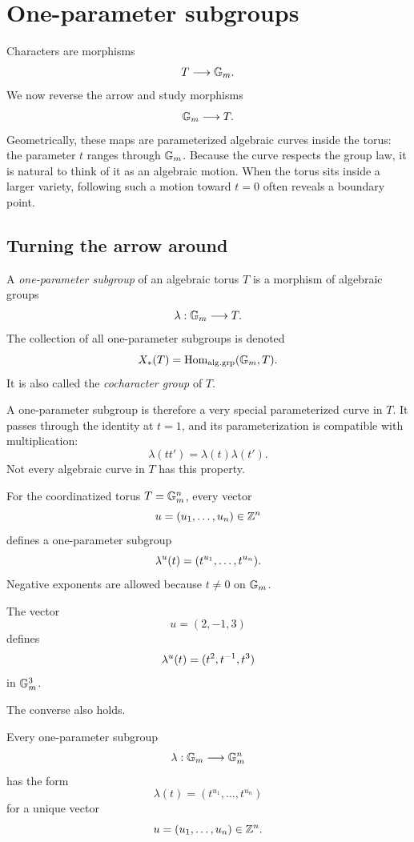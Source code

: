 \section{One-parameter subgroups}
\label{sec:one-parameter-subgroups}

Characters are morphisms
\[
T\longrightarrow\mathbb{G}_{m}.
\]
We now reverse the arrow and study morphisms
\[
\mathbb{G}_{m}\longrightarrow T.
\]
Geometrically, these maps are parameterized algebraic curves inside
the torus: the parameter \(t\) ranges through \(\mathbb{G}_{m}\). Because the
curve respects the group law, it is natural to think of it as an
algebraic motion. When the torus sits inside a larger variety,
following such a motion toward \(t=0\) often reveals a boundary point.

\subsection{Turning the arrow around}

\begin{definition}
A \emph{one-parameter subgroup} of an algebraic torus \(T\) is a
morphism of algebraic groups
\[
\lambda:\mathbb{G}_{m}\longrightarrow T.
\]
The collection of all one-parameter subgroups is denoted
\[
X_*(T)
=
\operatorname{Hom}_{\mathrm{alg.grp}}(\mathbb{G}_{m},T).
\]
It is also called the \emph{cocharacter group} of \(T\).
\end{definition}

A one-parameter subgroup is therefore a very special parameterized
curve in \(T\). It passes through the identity at \(t=1\), and its
parameterization is compatible with multiplication:
\[
\lambda(tt')=\lambda(t)\lambda(t').
\]
Not every algebraic curve in \(T\) has this property.

For the coordinatized torus \(T=\mathbb{G}_{m}^n\), every vector
\[
u=(u_1,\ldots,u_n)\in\mathbb{Z}^n
\]
defines a one-parameter subgroup
\[
\lambda^{u}(t)
=
(t^{u_1},\ldots,t^{u_n}).
\]
Negative exponents are allowed because \(t\neq0\) on \(\mathbb{G}_{m}\).

\begin{example}
The vector
\[
u=(2,-1,3)
\]
defines
\[
\lambda^{u}(t)
=
(t^2,t^{-1},t^3)
\]
in \(\mathbb{G}_{m}^3\).
\end{example}

The converse also holds.

\begin{theorem}
\label{thm:one-parameter-subgroups-split-torus}
Every one-parameter subgroup
\[
\lambda:\mathbb{G}_{m}\longrightarrow\mathbb{G}_{m}^n
\]
has the form
\[
\lambda(t)
=
(t^{u_1},\ldots,t^{u_n})
\]
for a unique vector
\[
u=(u_1,\ldots,u_n)\in\mathbb{Z}^n.
\]
\end{theorem}

